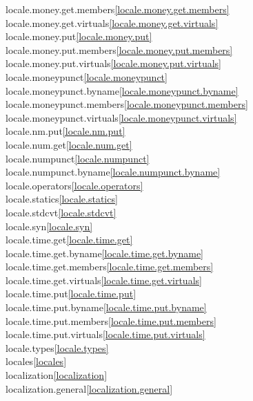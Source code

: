 \begin{multicols}{2}
locale.money.get.members\quad\ref{locale.money.get.members}\\
locale.money.get.virtuals\quad\ref{locale.money.get.virtuals}\\
locale.money.put\quad\ref{locale.money.put}\\
locale.money.put.members\quad\ref{locale.money.put.members}\\
locale.money.put.virtuals\quad\ref{locale.money.put.virtuals}\\
locale.moneypunct\quad\ref{locale.moneypunct}\\
locale.moneypunct.byname\quad\ref{locale.moneypunct.byname}\\
locale.moneypunct.members\quad\ref{locale.moneypunct.members}\\
locale.moneypunct.virtuals\quad\ref{locale.moneypunct.virtuals}\\
locale.nm.put\quad\ref{locale.nm.put}\\
locale.num.get\quad\ref{locale.num.get}\\
locale.numpunct\quad\ref{locale.numpunct}\\
locale.numpunct.byname\quad\ref{locale.numpunct.byname}\\
locale.operators\quad\ref{locale.operators}\\
locale.statics\quad\ref{locale.statics}\\
locale.stdcvt\quad\ref{locale.stdcvt}\\
locale.syn\quad\ref{locale.syn}\\
locale.time.get\quad\ref{locale.time.get}\\
locale.time.get.byname\quad\ref{locale.time.get.byname}\\
locale.time.get.members\quad\ref{locale.time.get.members}\\
locale.time.get.virtuals\quad\ref{locale.time.get.virtuals}\\
locale.time.put\quad\ref{locale.time.put}\\
locale.time.put.byname\quad\ref{locale.time.put.byname}\\
locale.time.put.members\quad\ref{locale.time.put.members}\\
locale.time.put.virtuals\quad\ref{locale.time.put.virtuals}\\
locale.types\quad\ref{locale.types}\\
locales\quad\ref{locales}\\
localization\quad\ref{localization}\\
localization.general\quad\ref{localization.general}\\

\end{multicols}
